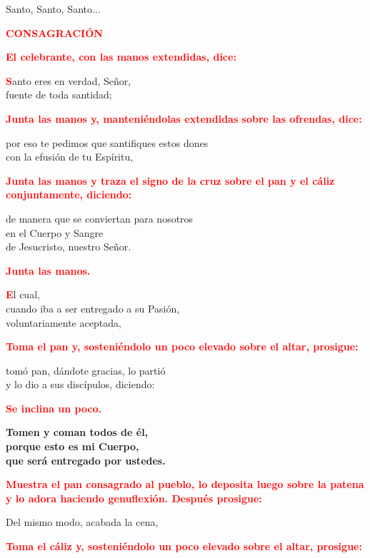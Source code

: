 \documentclass[12pt, letterpaper]{report}
\begin{document}
Santo, Santo, Santo...

\newpage

\Large {\bfseries \textcolor{red}{CONSAGRACI\'ON}} 

\large{\bfseries \textcolor{red}{El celebrante, con las manos extendidas, dice:}}

\lettrine[lines=1]{\bfseries \textcolor{red}{S}}{}\Large anto eres en verdad, Se\~nor,\\
fuente de toda santidad;

\large{\bfseries \textcolor{red}{Junta las manos y, manteni\'endolas extendidas sobre las ofrendas, dice:}}

\Large por eso te pedimos que santifiques estos dones\\
con la efusi\'on de tu Esp\'iritu,

\large{\bfseries \textcolor{red}{Junta las manos y traza el signo de la cruz sobre el pan y el c\'aliz conjuntamente, diciendo:}}

\Large de manera que se conviertan para nosotros\\
en el Cuerpo y \Huge{\textcolor{red}{}} \Large Sangre\\
de Jesucristo, nuestro Se\~nor.

\large{\bfseries \textcolor{red}{Junta las manos.}}

\lettrine[lines=1]{\bfseries \textcolor{red}{E}}{}\Large l cual,\\
cuando iba a ser entregado a su Pasi\'on,\\
voluntariamente aceptada,

\large{\bfseries \textcolor{red}{Toma el pan y, sosteni\'endolo un poco elevado sobre el altar, prosigue:}}

\Large tom\'o pan, d\'andote gracias, lo parti\'o\\
y lo dio a sus disc\'ipulos, diciendo:

\large{\bfseries \textcolor{red}{Se inclina un poco.}} 

\LARGE{ \bfseries{ Tomen y coman todos de \'el,\\
porque esto es mi Cuerpo,\\
que ser\'a entregado por ustedes.}}

\large{\bfseries \textcolor{red}{Muestra el pan consagrado al pueblo, lo deposita luego sobre la patena y lo adora haciendo genuflexi\'on. Despu\'es prosigue:}}

\Large Del mismo modo, acabada la cena,

\large{\bfseries \textcolor{red}{Toma el c\'aliz y, sosteni\'endolo un poco elevado sobre el altar, prosigue:}}
\end{document}
